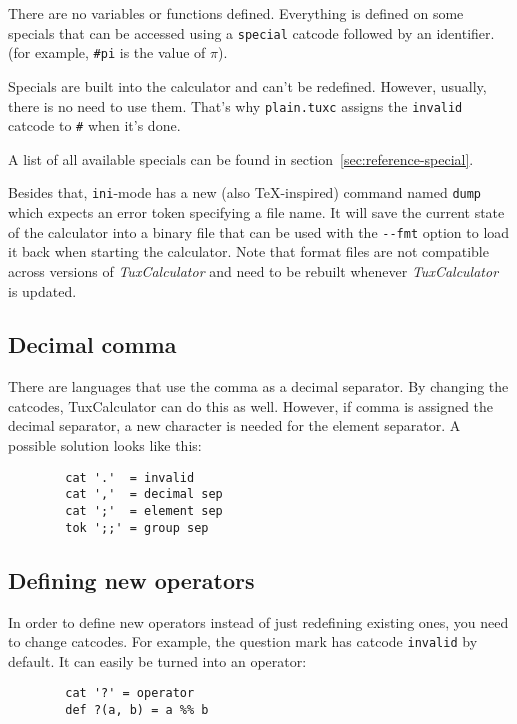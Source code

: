 \documentclass[10pt]{article}
\begin{document}
    There are no variables or functions defined.
    Everything is defined on some specials that can be accessed using a \verb|special| catcode followed by an identifier.
    (for example, \verb|#pi| is the value of $ \pi $).
    
    Specials are built into the calculator and can't be redefined.
    However, usually, there is no need to use them.
    That's why \verb|plain.tuxc| assigns the \verb|invalid| catcode to \verb|#| when it's done.
    
    A list of all available specials can be found in section~\ref{sec:reference-special}.
    
    Besides that, \verb|ini|-mode has a new (also \TeX-inspired) command named \verb|dump| which expects an error token specifying a file name.
    It will save the current state of the calculator into a binary file that can be used with the \verb|--fmt| option to load it back when starting the calculator.
    Note that format files are not compatible across versions of \textit{TuxCalculator} and need to be rebuilt whenever \textit{TuxCalculator} is updated.
    
    \subsection{Decimal comma}\label{subsec:decimal-comma}
    There are languages that use the comma as a decimal separator.
    By changing the catcodes, TuxCalculator can do this as well.
    However, if comma is assigned the decimal separator, a new character is needed for the element separator.
    A possible solution looks like this:
    \begin{verbatim}
        cat '.'  = invalid
        cat ','  = decimal sep
        cat ';'  = element sep
        tok ';;' = group sep
    \end{verbatim}
    
    \subsection{Defining new operators}\label{subsec:new-operators}
    In order to define new operators instead of just redefining existing ones, you need to change catcodes.
    For example, the question mark has catcode \verb|invalid| by default.
    It can easily be turned into an operator:
    \begin{verbatim}
        cat '?' = operator
        def ?(a, b) = a %% b
    \end{verbatim}
\end{document}
